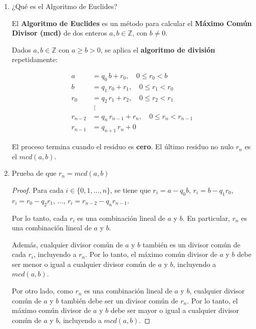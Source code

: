 \begin{enumerate}

\item ¿Qué es el Algoritmo de Euclides?

El \textbf{Algoritmo de Euclides} es un método para calcular el \textbf{Máximo Común Divisor
(mcd)} de dos enteros $a, b \in \mathbb{Z}$, con $b \neq 0$.

Dados $a, b \in \mathbb{Z}$ con $a \geq b > 0$, se aplica el
\textbf{algoritmo de división} repetidamente:

\begin{align*}
    a       &= q_0\, b      + r_0,      \quad 0 \leq r_0 < b      \\
    b       &= q_1\, r_0    + r_1,      \quad 0 \leq r_1 < r_0    \\
    r_0     &= q_2\, r_1    + r_2,      \quad 0 \leq r_2 < r_1    \\
            &\;\vdots                                               \\
    r_{n-2} &= q_n\, r_{n-1} + r_n,    \quad 0 \leq r_n < r_{n-1}\\
    r_{n-1} &= q_{n+1}\, r_n + 0
\end{align*}

El proceso termina cuando el residuo es \textbf{cero}. El último residuo
no nulo $r_n$ es el $mcd(a,b)$.

\item Prueba de que $r_n = mcd(a,b)$

\begin{proof}
    Para cada $i \in \{0, 1, \ldots, n\}$, se tiene que $r_i = a - q_0 b$,
    $r_i = b - q_1 r_0$, $r_i = r_0 - q_2 r_1$, $\ldots$, $r_i = r_{n-2} - q_n r_{n-1}$.

    Por lo tanto, cada $r_i$ es una combinación lineal de $a$ y $b$. En particular,
    $r_n$ es una combinación lineal de $a$ y $b$.

    Además, cualquier divisor común de $a$ y $b$ también es un divisor común de cada
    $r_i$, incluyendo a $r_n$. Por lo tanto, el máximo común divisor de $a$ y $b$
    debe ser menor o igual a cualquier divisor común de $a$ y $b$, incluyendo a
    $mcd(a,b)$.

    Por otro lado, como $r_n$ es una combinación lineal de $a$ y $b$, cualquier divisor común
    de $a$ y $b$ también debe ser un divisor común de $r_n$. Por lo tanto, el máximo común
    divisor de $a$ y $b$ debe ser mayor o igual a cualquier divisor común de $a$ y $b$, incluyendo a $mcd(a,b)$.


\end{proof}
\end{enumerate}
